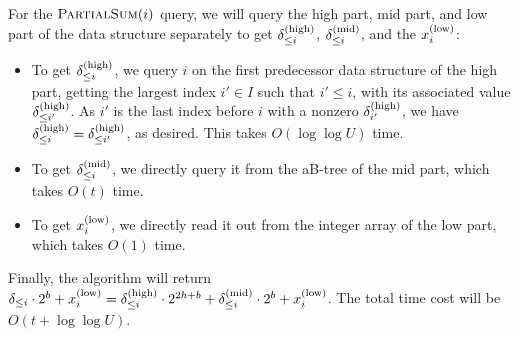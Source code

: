 \documentclass{article}
\theoremstyle{plain}
\theoremstyle{definition}  \newtheorem{definition}[theorem]{Definition}
\newcommand{\xlow}[1][i]{x_{#1}^{(\textup{low})}}
\newcommand{\deltamid}[1][i]{\delta_{#1}^{(\textup{mid})}}
\newcommand{\deltahigh}[1][i]{\delta_{#1}^{(\textup{high})}}
\newcommand{\partialsum}{\textup{\textsc{PartialSum}}\xspace}
\begin{document}
For the $\partialsum(i)$ query, we will query the high part, mid part, and low part of the data structure separately to get $\deltahigh[\le i]$, $\deltamid[\le i]$, and the $\xlow$:
\begin{itemize}
  \item To get $\deltahigh[\le i]$, we query $i$ on the first predecessor data structure of the high part, getting the largest index $i' \in I$ such that $i' \le i$, with its associated value $\deltahigh[\le i']$. As $i'$ is the last index before $i$ with a nonzero $\deltahigh[i']$, we have $\deltahigh[\le i] = \deltahigh[\le i']$, as desired. This takes $O(\log \log U)$ time.
  \item To get $\deltamid[\le i]$, we directly query it from the aB-tree of the mid part, which takes $O(t)$ time.
  \item To get $\xlow$, we directly read it out from the integer array of the low part, which takes $O(1)$ time.
\end{itemize}
Finally, the algorithm will return $\delta_{\le i} \cdot 2^b + \xlow =  \deltahigh[\le i] \cdot 2^{2h + b} + \deltamid[\le i] \cdot 2^{b} + \xlow$. The total time cost will be $O(t + \log \log U)$.

\smallskip
\end{document}
